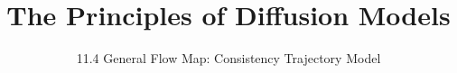 ﻿%

\title{The Principles of Diffusion Models}
\subtitle{11.4 General Flow Map: Consistency Trajectory Model}


\begin{frame}
    \titlepage
\end{frame}


